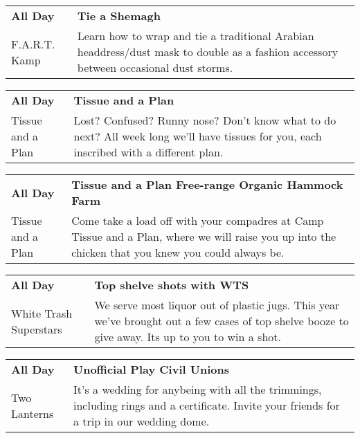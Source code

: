 \begin{tabular}{ p{1in} p{2.2in} }
    \textbf{All Day} & \textbf{Tie a Shemagh} \\
    F.A.R.T. Kamp \newline  & Learn how to wrap and tie a traditional Arabian headdress/dust mask to double as a fashion accessory between occasional dust storms. \\
    \hline 
\end{tabular}
    
\begin{tabular}{ p{1in} p{2.2in} }
    \textbf{All Day} & \textbf{Tissue and a Plan} \\
    Tissue and a Plan \newline  & Lost? Confused? Runny nose? Don't know what to do next? All week long we'll have tissues for you, each inscribed with a different plan. \\
    \hline 
\end{tabular}
    
\begin{tabular}{ p{1in} p{2.2in} }
    \textbf{All Day} & \textbf{Tissue and a Plan Free-range Organic Hammock Farm} \\
    Tissue and a Plan \newline  & Come take a load off with your compadres at Camp Tissue and a Plan, where we will raise you up into the chicken that you knew you could always be. \\
    \hline 
\end{tabular}
    
\begin{tabular}{ p{1in} p{2.2in} }
    \textbf{All Day} & \textbf{Top shelve shots with WTS} \\
    White Trash Superstars \newline  & We serve most liquor out of plastic jugs. This year we've brought out a few cases of top shelve booze to give away. Its up to you to win a shot. \\
    \hline 
\end{tabular}
    
\begin{tabular}{ p{1in} p{2.2in} }
    \textbf{All Day} & \textbf{Unofficial Play Civil Unions} \\
    Two Lanterns \newline  & It's a wedding for anybeing with all the trimmings, including rings and a certificate.  Invite your friends for a trip in our wedding dome. \\
    \hline 
\end{tabular}
    
